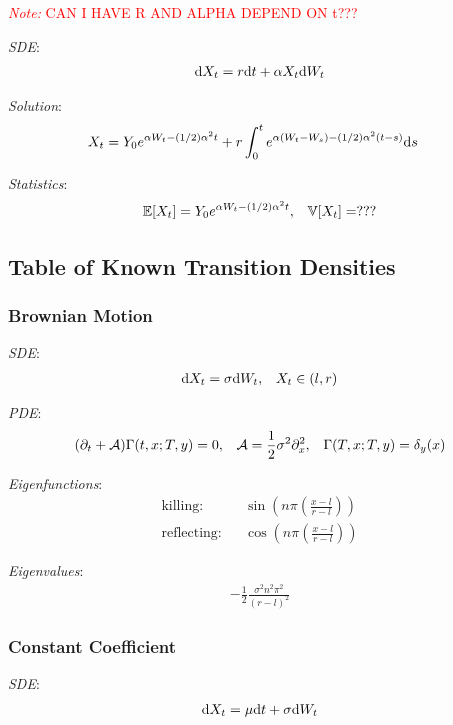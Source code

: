 \documentclass[12pt]{article}
\newcommand{\note}[1]{\textcolor{red}{\textit{Note:} #1}}
\begin{document}
\note{CAN I HAVE R AND ALPHA DEPEND ON t???}

\textit{SDE}:
\begin{align*}
    \mathrm{d} X_t = r \mathrm{d} t + \alpha X_t \mathrm{d} W_t
\end{align*}

\textit{Solution}:
\begin{align*}
    X_t &= Y_0 e^{\alpha W_t - (1/2)\alpha^2 t} + r \int_{0}^{t} e^{\alpha(W_t-W_s)-(1/2)\alpha^2(t-s)} \mathrm{d} s
\end{align*}

\textit{Statistics}:
\begin{align*}
    \mathbb{E}[X_t] = Y_0 e^{\alpha W_t - (1/2) \alpha^2 t}
    ,&&
    \mathbb{V}[X_t] = ??? 
\end{align*}


\subsection{Table of Known Transition Densities}
\subsubsection{Brownian Motion}
\textit{SDE}:
\begin{align*}
    \mathrm{d} X_t = \sigma \mathrm{d} W_t, && X_t\in(l,r)
\end{align*}

\textit{PDE}:
\begin{align*}
    (\partial_t + \mathcal{A}) \Gamma(t,x;T,y) = 0,&& \mathcal{A} = \frac{1}{2}\sigma^2 \partial_x^2 ,&& \Gamma(T,x;T,y) = \delta_y(x)
\end{align*}

\textit{Eigenfunctions}:
\begin{align*}
    \text{killing:} &&  \sin \left( n \pi \left( \frac{x-l}{r-l} \right) \right)\\
    \text{reflecting:} &&  \cos \left( n \pi \left( \frac{x-l}{r-l} \right) \right)
\end{align*}

\textit{Eigenvalues}:
\begin{align*}
    - \frac{1}{2} \frac{\sigma^2 n^2 \pi^2}{(r-l)^2}
\end{align*}


\subsubsection{Constant Coefficient}
\textit{SDE}:
\begin{align*}
    \mathrm{d} X_t = \mu \mathrm{d} t + \sigma \mathrm{d} W_t
\end{align*}
\end{document}
